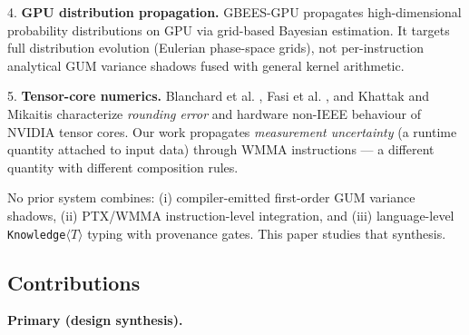 \documentclass[11pt]{article}
\begin{document}
4. \textbf{GPU distribution propagation.} GBEES-GPU \cite{gbeesgpu2025} propagates high-dimensional probability distributions on GPU via grid-based Bayesian estimation. It targets full distribution evolution (Eulerian phase-space grids), not per-instruction analytical GUM variance shadows fused with general kernel arithmetic.

5. \textbf{Tensor-core numerics.} Blanchard et al. \cite{blanchard2020}, Fasi et al. \cite{fasi2021}, and Khattak and Mikaitis \cite{khattak2025} characterize \emph{rounding error} and hardware non-IEEE behaviour of NVIDIA tensor cores. Our work propagates \emph{measurement uncertainty} (a runtime quantity attached to input data) through WMMA instructions --- a different quantity with different composition rules.

No prior system combines: (i) compiler-emitted first-order GUM variance shadows, (ii) PTX/WMMA instruction-level integration, and (iii) language-level \texttt{Knowledge}$\langle T \rangle$ typing with provenance gates. This paper studies that synthesis.

\subsection{Contributions}

\textbf{Primary (design synthesis).}
\end{document}
